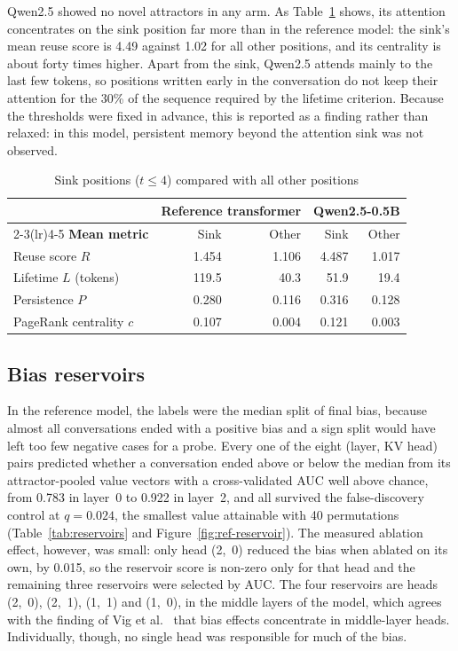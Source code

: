 Qwen2.5 showed no novel attractors in any arm. As Table~\ref{tab:sinks} shows, its attention concentrates on the sink position far more than in the reference model: the sink's mean reuse score is 4.49 against 1.02 for all other positions, and its centrality is about forty times higher. Apart from the sink, Qwen2.5 attends mainly to the last few tokens, so positions written early in the conversation do not keep their attention for the 30\% of the sequence required by the lifetime criterion. Because the thresholds were fixed in advance, this is reported as a finding rather than relaxed: in this model, persistent memory beyond the attention sink was not observed.

\begin{table}[htbp]
\centering
\caption{Sink positions ($t \le 4$) compared with all other positions}\label{tab:sinks}
\small
\begin{tabular}{@{}lrrrr@{}}
\toprule
 & \multicolumn{2}{c}{\textbf{Reference transformer}} & \multicolumn{2}{c}{\textbf{Qwen2.5-0.5B}} \\
\cmidrule(lr){2-3}\cmidrule(lr){4-5}
\textbf{Mean metric} & Sink & Other & Sink & Other \\
\midrule
Reuse score $R$ & 1.454 & 1.106 & 4.487 & 1.017 \\
Lifetime $L$ (tokens) & 119.5 & 40.3 & 51.9 & 19.4 \\
Persistence $P$ & 0.280 & 0.116 & 0.316 & 0.128 \\
PageRank centrality $c$ & 0.107 & 0.004 & 0.121 & 0.003 \\
\bottomrule
\end{tabular}
\end{table}

\subsection{Bias reservoirs}
In the reference model, the labels were the median split of final bias, because almost all conversations ended with a positive bias and a sign split would have left too few negative cases for a probe. Every one of the eight (layer, KV head) pairs predicted whether a conversation ended above or below the median from its attractor-pooled value vectors with a cross-validated AUC well above chance, from 0.783 in layer~0 to 0.922 in layer~2, and all survived the false-discovery control at $q = 0.024$, the smallest value attainable with 40 permutations (Table~\ref{tab:reservoirs} and Figure~\ref{fig:ref-reservoir}). The measured ablation effect, however, was small: only head (2,~0) reduced the bias when ablated on its own, by 0.015, so the reservoir score is non-zero only for that head and the remaining three reservoirs were selected by AUC. The four reservoirs are heads (2,~0), (2,~1), (1,~1) and (1,~0), in the middle layers of the model, which agrees with the finding of Vig et al.~\cite{vig2020causal} that bias effects concentrate in middle-layer heads. Individually, though, no single head was responsible for much of the bias.

